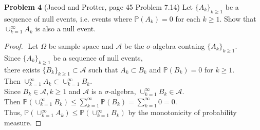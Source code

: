 \documentclass{article}
\newcommand{\bbp}{\mathbb{P}}
\newcommand{\lla}{\mathcal{A}}
\begin{document}
 \setcounter{page}{6}
\vspace{3 mm}

\noindent \textbf{Problem 4} (Jacod and Protter, page 45 Problem 7.14) Let $\{A_{k}\}_{k \geq 1}$ be a sequence of null events, i.e. events where $\mathbb{P}(A_{k}) = 0$ for     each $k \geq 1$.  Show that $\cup_{k=1}^{\infty}A_{k}$ is also a null event.

\begin{proof}
 	$ $\newline
	Let $\Omega$ be sample space and $\lla$ be the $\sigma$-algebra containg $\{A_{k}\}_{k \geq 1}$.\\
	Since $\{A_{k}\}_{k \geq 1}$ be a sequence of null events, \\
	there exists $\{B_{k}\}_{k \geq 1} \subset \lla$ such that $A_k \subset B_k$ and $\bbp(B_k) = 0$ for $k \geq 1$.\\
	Then $\cup_{k=1}^{\infty} A_k \subset \cup_{k=1}^{\infty} B_k$.\\
	Since $B_k \in \lla, k\geq 1$ and $\lla$ is a $\sigma$-algebra, $\cup_{k=1}^{\infty} B_k \in \lla$.\\
	Then $\bbp(\cup_{k=1}^{\infty}B_k) \leq \sum_{k=1}^{\infty}\bbp(B_k) = \sum_{k=1}^{\infty}0 = 0 $.\\
	Thus, $\bbp({\cup_{k=1}^{\infty} A_k}) \leq \bbp({\cup_{k=1}^{\infty} B_k})$ by the monotonicity of probability measure.
\end{proof}
\end{document}
